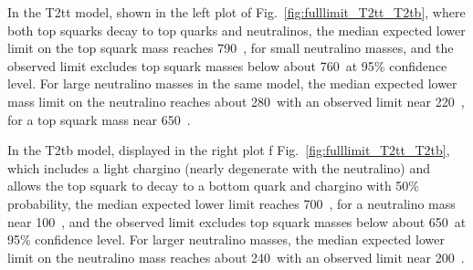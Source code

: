 In the T2tt model, shown in the left plot of Fig.~\ref{fig:fulllimit_T2tt_T2tb}, where both top squarks decay to top quarks and neutralinos, the median expected lower limit on the top squark mass reaches 790~\GeV, for small neutralino masses, and the observed limit excludes top squark masses below about 760~\GeV at 95\% confidence level.  
%
For large neutralino masses in the same model, the median expected lower mass limit on the neutralino reaches about 280~\GeV with an observed limit near 220~\GeV, for a top squark mass near 650~\GeV. 

In the T2tb model, displayed in the right plot f Fig.~\ref{fig:fulllimit_T2tt_T2tb}, which includes a light chargino (nearly degenerate with the neutralino) and allows the top squark to decay to a bottom quark and chargino with 50\% probability, the median expected lower limit reaches 700~\GeV, for a neutralino mass near 100~\GeV, and the observed limit excludes top squark masses below about 650~\GeV at 95\% confidence level. 
%
For larger neutralino masses, the median expected lower limit on the neutralino mass reaches about 240~\GeV with an observed limit near 200~\GeV. 









